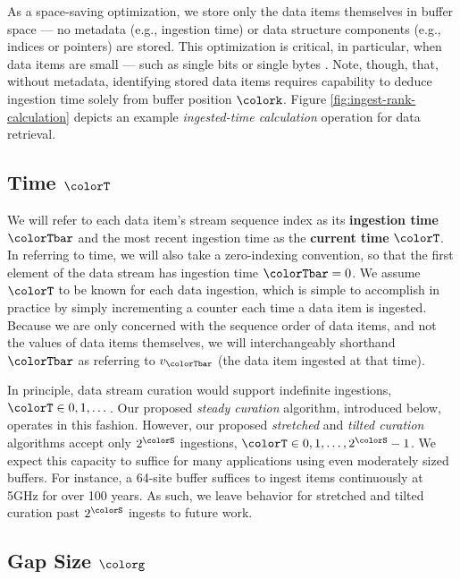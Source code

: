 As a space-saving optimization, we store only the data items themselves in buffer space --- no metadata (e.g., ingestion time) or data structure components (e.g., indices or pointers) are stored.
This optimization is critical, in particular, when data items are small --- such as single bits or single bytes \citep{moreno2022hereditary}.
Note, though, that, without metadata, identifying stored data items requires capability to deduce ingestion time solely from buffer position $\colork$.
Figure \ref{fig:ingest-rank-calculation} depicts an example \textit{ingested-time calculation} operation for data retrieval.

\subsection{Time $\colorT$}
\label{sec:notation-time}

We will refer to each data item's stream sequence index as its \textbf{ingestion time} $\colorTbar$ and the most recent ingestion time as the \textbf{current time} $\colorT$.
In referring to time, we will also take a zero-indexing convention, so that the first element of the data stream has ingestion time $\colorTbar=0$.
We assume $\colorT$ to be known for each data ingestion, which is simple to accomplish in practice by simply incrementing a counter each time a data item is ingested.
Because we are only concerned with the sequence order of data items, and not the values of data items themselves, we will interchangeably shorthand $\colorTbar$ as referring to $v_{\colorTbar}$ (the data item ingested at that time).

In principle, data stream curation would support indefinite ingestions, $\colorT \in 0, 1, \ldots \,$.
Our proposed \textit{steady curation} algorithm, introduced below, operates in this fashion.
However, our proposed \textit{stretched} and \textit{tilted curation} algorithms accept only $2^{\colorS}$ ingestions, $\colorT \in 0, 1, \ldots, 2^{\colorS} - 1$.
We expect this capacity to suffice for many applications using even moderately sized buffers.
For instance, a 64-site buffer suffices to ingest items continuously at 5GHz for over 100 years.
As such, we leave behavior for stretched and tilted curation past $2^{\colorS}$ ingests to future work.

\subsection{Gap Size $\colorg$}
\label{sec:notation-gapsize}

